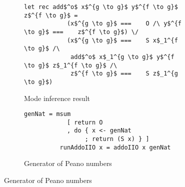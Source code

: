 
\begin{columns}[t]
    \begin{column}{0.49\textwidth}
        \begin{figure}[h!]
        \centering
          \begin{subfigure}[b]{0.45\textwidth}
            \begin{lstlisting}[frame=tb]
          let rec add$^o$ x$^{g \to g}$ y$^{f \to g}$ z$^{f \to g}$ =
            (x$^{g \to g}$ ===    O /\ y$^{f \to g}$ ===    z$^{f \to g}$) \/
            (x$^{g \to g}$ ===    S x$_1^{f \to g}$ /\
             add$^o$ x$_1^{g \to g}$ y$^{f \to g}$ z$_1^{f \to g}$ /\
             z$^{f \to g}$ ===    S z$_1^{g \to g}$)
            \end{lstlisting}
           \caption{Mode inference result}
            \label{fig:addo_modded}
          \end{subfigure}
          \hfill
          \begin{subfigure}[b]{0.45\textwidth}
            \begin{lstlisting}[frame=tb]
          genNat = msum
            [ return O
            , do { x <- genNat
                 ; return (S x) } ]
          runAddoIIO x = addoIIO x genNat
            \end{lstlisting}
           \caption{Generator of Peano numbers}
          \end{subfigure}
        \end{figure}
    
    \end{column}
    \begin{column}{0.49\textwidth}
        
    \end{column}
\end{columns}

